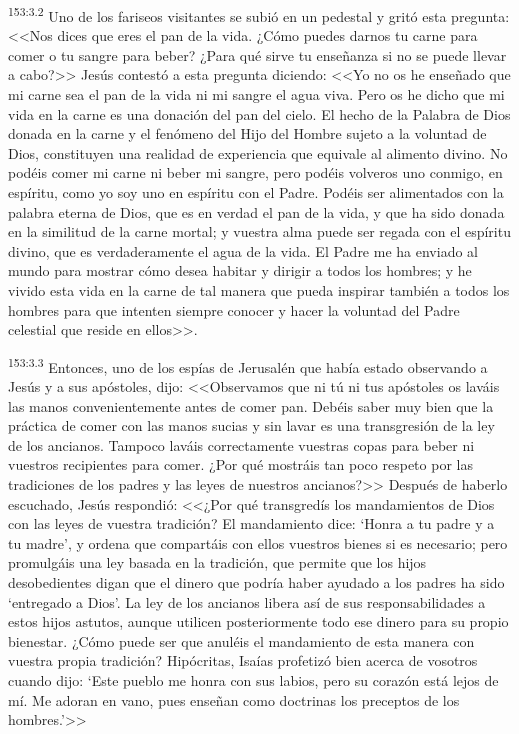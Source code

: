 \par 
\textsuperscript{153:3.2} Uno de los fariseos visitantes se subió en un pedestal y gritó esta pregunta: <<Nos dices que eres el pan de la vida. ¿Cómo puedes darnos tu carne para comer o tu sangre para beber? ¿Para qué sirve tu enseñanza si no se puede llevar a cabo?>> Jesús contestó a esta pregunta diciendo: <<Yo no os he enseñado que mi carne sea el pan de la vida ni mi sangre el agua viva. Pero os he dicho que mi vida en la carne es una donación del pan del cielo. El hecho de la Palabra de Dios donada en la carne y el fenómeno del Hijo del Hombre sujeto a la voluntad de Dios, constituyen una realidad de experiencia que equivale al alimento divino. No podéis comer mi carne ni beber mi sangre, pero podéis volveros uno conmigo, en espíritu, como yo soy uno en espíritu con el Padre. Podéis ser alimentados con la palabra eterna de Dios, que es en verdad el pan de la vida, y que ha sido donada en la similitud de la carne mortal; y vuestra alma puede ser regada con el espíritu divino, que es verdaderamente el agua de la vida. El Padre me ha enviado al mundo para mostrar cómo desea habitar y dirigir a todos los hombres; y he vivido esta vida en la carne de tal manera que pueda inspirar también a todos los hombres para que intenten siempre conocer y hacer la voluntad del Padre celestial que reside en ellos>>.

\par 
\textsuperscript{153:3.3} Entonces, uno de los espías de Jerusalén que había estado observando a Jesús y a sus apóstoles, dijo: <<Observamos que ni tú ni tus apóstoles os laváis las manos convenientemente antes de comer pan. Debéis saber muy bien que la práctica de comer con las manos sucias y sin lavar es una transgresión de la ley de los ancianos. Tampoco laváis correctamente vuestras copas para beber ni vuestros recipientes para comer. ¿Por qué mostráis tan poco respeto por las tradiciones de los padres y las leyes de nuestros ancianos?>> Después de haberlo escuchado, Jesús respondió: <<¿Por qué transgredís los mandamientos de Dios con las leyes de vuestra tradición? El mandamiento dice: `Honra a tu padre y a tu madre', y ordena que compartáis con ellos vuestros bienes si es necesario; pero promulgáis una ley basada en la tradición, que permite que los hijos desobedientes digan que el dinero que podría haber ayudado a los padres ha sido `entregado a Dios'. La ley de los ancianos libera así de sus responsabilidades a estos hijos astutos, aunque utilicen posteriormente todo ese dinero para su propio bienestar. ¿Cómo puede ser que anuléis el mandamiento de esta manera con vuestra propia tradición? Hipócritas, Isaías profetizó bien acerca de vosotros cuando dijo: `Este pueblo me honra con sus labios, pero su corazón está lejos de mí. Me adoran en vano, pues enseñan como doctrinas los preceptos de los hombres.'>>

